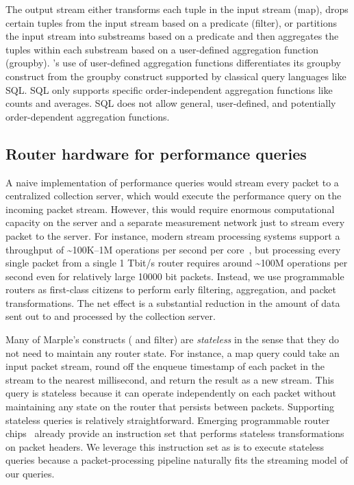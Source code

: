 The output stream either transforms each tuple in the input stream ({\ct map}),
drops certain tuples from the input stream based on a predicate ({\ct filter}),
or partitions the input stream into substreams based on a predicate and then
aggregates the tuples within each substream based on a user-defined aggregation
function ({\ct groupby}). \TheSystem's use of user-defined aggregation
functions differentiates its groupby construct from the groupby construct
supported by classical query languages like SQL. SQL only supports specific
order-independent aggregation functions like counts and averages. SQL does not
allow general, user-defined, and potentially order-dependent aggregation
functions. 

\subsection{Router hardware for performance queries}
\label{ss:intro_pq_hardware}

A naive implementation of performance queries would stream every packet to a
centralized collection server, which would execute the performance query on the
incoming packet stream. However, this would require enormous computational
capacity on the server and a separate measurement network just to stream every
packet to the server. For instance, modern stream processing systems support a
throughput of \textasciitilde100K--1M operations per second per
core~\cite{kafka_benchmark, redis_benchmark, memcached_benchmark,
redis_vs_memcached_update, spark-streaming}, but processing every single packet
from a single 1 Tbit/s router requires around \textasciitilde100M operations
per second even for relatively large 10000 bit packets. Instead, we use programmable
routers as first-class citizens to perform early filtering, aggregation, and
packet transformations. The net effect is a substantial reduction in the amount
of data sent out to and processed by the collection server.

Many of Marple's constructs ( and {\ct filter}) are {\em
stateless} in the sense that they do not need to maintain any router state. For
instance, a {\ct map} query could take an input packet stream, round
off the enqueue timestamp of each packet in the stream to the nearest
millisecond, and return the result as a new stream.  This query is stateless
because it can operate independently on each packet without maintaining any
state on the router that persists between packets. Supporting stateless queries
 is relatively straightforward. Emerging
programmable router chips~\cite{rmt, xpliant, flexpipe, tofino} already provide
an instruction set that performs stateless transformations on packet headers.
We leverage this instruction set as is to execute stateless queries because a
packet-processing pipeline naturally fits the streaming model of our queries.

